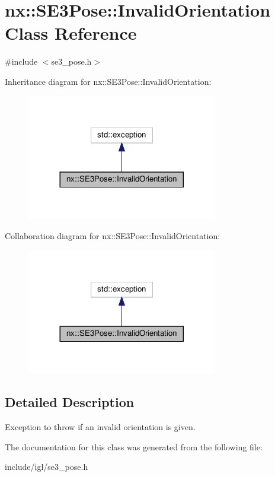 \hypertarget{classnx_1_1SE3Pose_1_1InvalidOrientation}{}\section{nx\+:\+:S\+E3\+Pose\+:\+:Invalid\+Orientation Class Reference}
\label{classnx_1_1SE3Pose_1_1InvalidOrientation}


{\ttfamily \#include $<$se3\+\_\+pose.\+h$>$}



Inheritance diagram for nx\+:\+:S\+E3\+Pose\+:\+:Invalid\+Orientation\+:
\nopagebreak
\begin{figure}[H]
\begin{center}
\leavevmode
\includegraphics[width=236pt]{classnx_1_1SE3Pose_1_1InvalidOrientation__inherit__graph}
\end{center}
\end{figure}


Collaboration diagram for nx\+:\+:S\+E3\+Pose\+:\+:Invalid\+Orientation\+:
\nopagebreak
\begin{figure}[H]
\begin{center}
\leavevmode
\includegraphics[width=236pt]{classnx_1_1SE3Pose_1_1InvalidOrientation__coll__graph}
\end{center}
\end{figure}


\subsection{Detailed Description}
Exception to throw if an invalid orientation is given. 

The documentation for this class was generated from the following file\+:\begin{DoxyCompactItemize}
\item 
include/igl/se3\+\_\+pose.\+h\end{DoxyCompactItemize}
